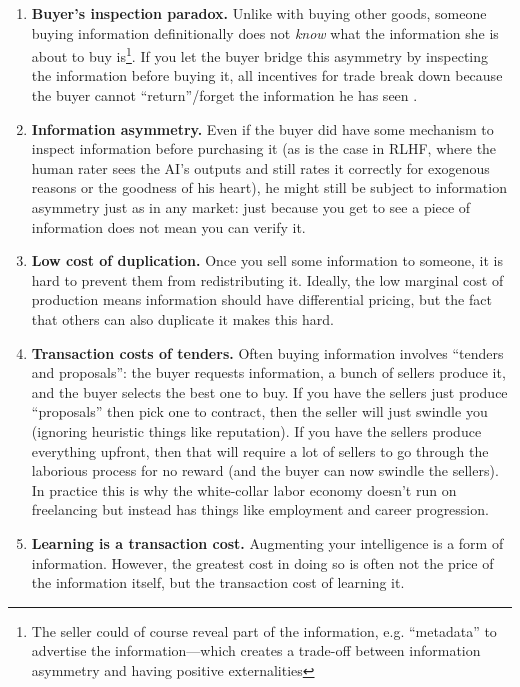 \begin{enumerate}
    \item \textbf{Buyer's inspection paradox.} Unlike with buying other goods, someone buying information definitionally does not \emph{know} what the information she is about to buy is\footnote{The seller could of course reveal part of the information, e.g. ``metadata'' to advertise the information---which creates a trade-off between information asymmetry and having positive externalities}. If you let the buyer bridge this asymmetry by inspecting the information before buying it, all incentives for trade break down because the buyer cannot ``return''/forget the information he has seen \citep{arrow1972economic,vanAlstyne1999AproposalValuingInformationInstrumentalGoods}.
    \item \textbf{Information asymmetry.} Even if the buyer did have some mechanism to inspect information before purchasing it (as is the case in RLHF, where the human rater sees the AI's outputs and still rates it correctly for exogenous reasons or the goodness of his heart), he might still be subject to information asymmetry just as in any market: just because you get to see a piece of information does not mean you can verify it.
    \item \textbf{Low cost of duplication.} Once you sell some information to someone, it is hard to prevent them from redistributing it. Ideally, the low marginal cost of production means information should have differential pricing, but the fact that others can also duplicate it makes this hard.
    \item \textbf{Transaction costs of tenders.} Often buying information involves ``tenders and proposals'': the buyer requests information, a bunch of sellers produce it, and the buyer selects the best one to buy. If you have the sellers just produce ``proposals'' then pick one to contract, then the seller will just swindle you (ignoring heuristic things like reputation). If you have the sellers produce everything upfront, then that will require a lot of sellers to go through the laborious process for no reward (and the buyer can now swindle the sellers). In practice this is why the white-collar labor economy doesn't run on freelancing but instead has things like employment and career progression.
    \item \textbf{Learning is a transaction cost.} Augmenting your intelligence is a form of information. However, the greatest cost in doing so is often not the price of the information itself, but the transaction cost of learning it.
\end{enumerate}

